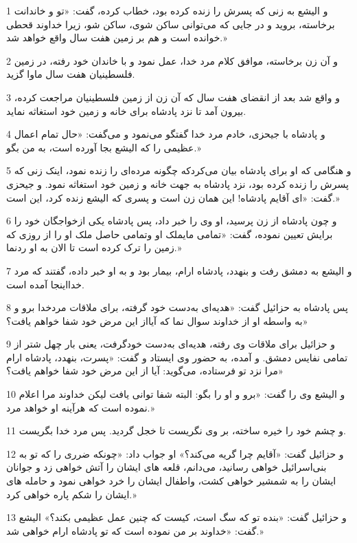 \par 1 و الیشع به زنی که پسرش را زنده کرده بود، خطاب کرده، گفت: «تو و خاندانت برخاسته، بروید و در جایی که می‌توانی ساکن شوی، ساکن شو، زیرا خداوند قحطی خوانده است و هم بر زمین هفت سال واقع خواهد شد.»
\par 2 و آن زن برخاسته، موافق کلام مرد خدا، عمل نمود و با خاندان خود رفته، در زمین فلسطینیان هفت سال ماوا گزید.
\par 3 و واقع شد بعد از انقضای هفت سال که آن زن از زمین فلسطینیان مراجعت کرده، بیرون آمد تا نزد پادشاه برای خانه و زمین خود استغاثه نماید.
\par 4 و پادشاه با جیحزی، خادم مرد خدا گفتگو می‌نمود و می‌گفت: «حال تمام اعمال عظیمی را که الیشع بجا آورده است، به من بگو.»
\par 5 و هنگامی که او برای پادشاه بیان می‌کردکه چگونه مرده‌ای را زنده نمود، اینک زنی که پسرش را زنده کرده بود، نزد پادشاه به جهت خانه و زمین خود استغاثه نمود. و جیحزی گفت: «ای آقایم پادشاه! این همان زن است و پسری که الیشع زنده کرد، این است.»
\par 6 و چون پادشاه از زن پرسید، او وی را خبر داد، پس پادشاه یکی ازخواجگان خود را برایش تعیین نموده، گفت: «تمامی مایملک او وتمامی حاصل ملک او را از روزی که زمین را ترک کرده است تا الان به او ردنما.»
\par 7 و الیشع به دمشق رفت و بنهدد، پادشاه ارام، بیمار بود و به او خبر داده، گفتند که مرد خدااینجا آمده است.
\par 8 پس پادشاه به حزائیل گفت: «هدیه‌ای به‌دست خود گرفته، برای ملاقات مردخدا برو و به واسطه او از خداوند سوال نما که آیااز این مرض خود شفا خواهم یافت؟»
\par 9 و حزائیل برای ملاقات وی رفته، هدیه‌ای به‌دست خودگرفت، یعنی بار چهل شتر از تمامی نفایس دمشق. و آمده، به حضور وی ایستاد و گفت: «پسرت، بنهدد، پادشاه ارام مرا نزد تو فرستاده، می‌گوید: آیا از این مرض خود شفا خواهم یافت؟»
\par 10 و الیشع وی را گفت: «برو و او را بگو: البته شفا توانی یافت لیکن خداوند مرا اعلام نموده است که هرآینه او خواهد مرد.»
\par 11 و چشم خود را خیره ساخته، بر وی نگریست تا خجل گردید. پس مرد خدا بگریست.
\par 12 و حزائیل گفت: «آقایم چرا گریه می‌کند؟» او جواب داد: «چونکه ضرری را که تو به بنی‌اسرائیل خواهی رسانید، می‌دانم، قلعه های ایشان را آتش خواهی زد و جوانان ایشان را به شمشیر خواهی کشت، واطفال ایشان را خرد خواهی نمود و حامله های ایشان را شکم پاره خواهی کرد.»
\par 13 و حزائیل گفت: «بنده تو که سگ است، کیست که چنین عمل عظیمی بکند؟» الیشع گفت: «خداوند بر من نموده است که تو پادشاه ارام خواهی شد.»
